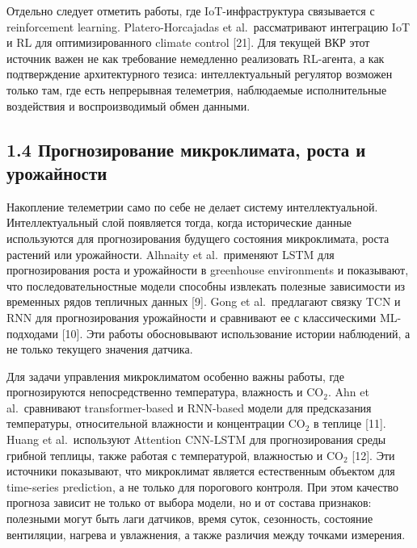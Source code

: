 \documentclass[a4paper,14pt]{extarticle}
\begin{document}
Отдельно следует отметить работы, где IoT-инфраструктура связывается с
reinforcement learning. Platero-Horcajadas et al.~рассматривают
интеграцию IoT и RL для оптимизированного climate control {[}21{]}. Для
текущей ВКР этот источник важен не как требование немедленно реализовать
RL-агента, а как подтверждение архитектурного тезиса: интеллектуальный
регулятор возможен только там, где есть непрерывная телеметрия,
наблюдаемые исполнительные воздействия и воспроизводимый обмен данными.

\hypertarget{ux43fux440ux43eux433ux43dux43eux437ux438ux440ux43eux432ux430ux43dux438ux435-ux43cux438ux43aux440ux43eux43aux43bux438ux43cux430ux442ux430-ux440ux43eux441ux442ux430-ux438-ux443ux440ux43eux436ux430ux439ux43dux43eux441ux442ux438}{%
\subsection{1.4 Прогнозирование микроклимата, роста и
урожайности}\label{ux43fux440ux43eux433ux43dux43eux437ux438ux440ux43eux432ux430ux43dux438ux435-ux43cux438ux43aux440ux43eux43aux43bux438ux43cux430ux442ux430-ux440ux43eux441ux442ux430-ux438-ux443ux440ux43eux436ux430ux439ux43dux43eux441ux442ux438}}

Накопление телеметрии само по себе не делает систему интеллектуальной.
Интеллектуальный слой появляется тогда, когда исторические данные
используются для прогнозирования будущего состояния микроклимата, роста
растений или урожайности. Alhnaity et al.~применяют LSTM для
прогнозирования роста и урожайности в greenhouse environments и
показывают, что последовательностные модели способны извлекать полезные
зависимости из временных рядов тепличных данных {[}9{]}. Gong et
al.~предлагают связку TCN и RNN для прогнозирования урожайности и
сравнивают ее с классическими ML-подходами {[}10{]}. Эти работы
обосновывают использование истории наблюдений, а не только текущего
значения датчика.

Для задачи управления микроклиматом особенно важны работы, где
прогнозируются непосредственно температура, влажность и CO\(_2\). Ahn et
al.~сравнивают transformer-based и RNN-based модели для предсказания
температуры, относительной влажности и концентрации CO\(_2\) в теплице
{[}11{]}. Huang et al.~используют Attention CNN-LSTM для прогнозирования
среды грибной теплицы, также работая с температурой, влажностью и
CO\(_2\) {[}12{]}. Эти источники показывают, что микроклимат является
естественным объектом для time-series prediction, а не только для
порогового контроля. При этом качество прогноза зависит не только от
выбора модели, но и от состава признаков: полезными могут быть лаги
датчиков, время суток, сезонность, состояние вентиляции, нагрева и
увлажнения, а также различия между точками измерения.
\end{document}
